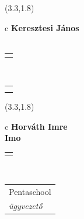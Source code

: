 \documentclass[11pt]{article}
\begin{document}
\makebox(3.3,1.8){
  \renewcommand\arraystretch{1.3}
  \begin{tabular}[c]{c}
    \hspace{8.5mm}
    \LARGE\bf{ Keresztesi János }\\
    \hspace{8.5mm}
    \Large{  }\\
    \renewcommand\arraystretch{3}
    \begin{tabular}[c]{c}
      \centering
      \fontfamily{phv}\selectfont{
        \textbf{
          \textsc{
            \scriptsize{
            \color{Dark}{ Ismerkedő }\color{Bright}{ Webmester }\color{Bright}{ Sminkmester }\color{Bright}{ Programozó }
            }
          }
        }
      }
    \end{tabular}
    \\
    \renewcommand\arraystretch{1}
    \begin{tabular}{p{3.3in}}
      \hspace{.7cm}\\
      \hspace{.7cm}\emph{  }\\
    \end{tabular}
  \end{tabular}
}

\makebox(3.3,1.8){
  \renewcommand\arraystretch{1.3}
  \begin{tabular}[c]{c}
    \hspace{8.5mm}
    \LARGE\bf{ Horváth Imre }\\
    \hspace{8.5mm}
    \Large{ Imo }\\
    \renewcommand\arraystretch{3}
    \begin{tabular}[c]{c}
      \centering
      \fontfamily{phv}\selectfont{
        \textbf{
          \textsc{
            \scriptsize{
            \color{Dark}{ Ismerkedő }\color{Dark}{ Webmester }\color{Bright}{ Sminkmester }\color{Bright}{ Programozó }
            }
          }
        }
      }
    \end{tabular}
    \\
    \renewcommand\arraystretch{1}
    \begin{tabular}{p{3.3in}}
      \hspace{.7cm}Pentaschool\\
      \hspace{.7cm}\emph{ ügyvezető }\\
    \end{tabular}
  \end{tabular}
}
\end{document}
